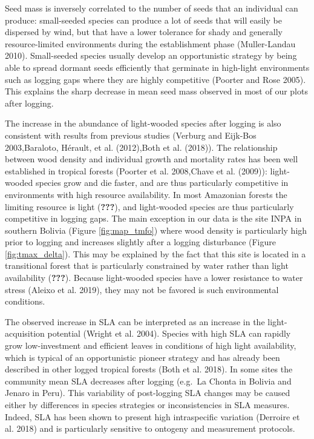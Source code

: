\documentclass[]{elsarticle} %
\begin{document}
Seed mass is inversely correlated to the number of seeds that an
individual can produce: small-seeded species can produce a lot of seeds
that will easily be dispersed by wind, but that have a lower tolerance
for shady and generally resource-limited environments during the
establishment phase (Muller-Landau 2010). Small-seeded species usually
develop an opportunistic strategy by being able to spread dormant seeds
efficiently that germinate in high-light environments such as logging
gaps where they are highly competitive (Poorter and Rose 2005). This
explains the sharp decrease in mean seed mass observed in most of our
plots after logging.

The increase in the abundance of light-wooded species after logging is
also consistent with results from previous studies (Verburg and Eijk-Bos
2003,Baraloto, Hérault, et al. (2012),Both et al. (2018)). The
relationship between wood density and individual growth and mortality
rates has been well established in tropical forests (Poorter et al.
2008,Chave et al. (2009)): light-wooded species grow and die faster, and
are thus particularly competitive in environments with high resource
availability. In most Amazonian forests the limiting resource is light
({\textbf{???}}), and light-wooded species are thus particularly
competitive in logging gaps. The main exception in our data is the site
INPA in southern Bolivia (Figure \ref{fig:map_tmfo}) where wood density
is particularly high prior to logging and increases slightly after a
logging disturbance (Figure \ref{fig:tmax_delta}). This may be explained
by the fact that this site is located in a transitional forest that is
particularly constrained by water rather than light availability
({\textbf{???}}). Because light-wooded species have a lower resistance
to water stress (Aleixo et al. 2019), they may not be favored is such
environmental conditions.

The observed increase in SLA can be interpreted as an increase in the
light-acquisition potential (Wright et al. 2004). Species with high SLA
can rapidly grow low-investment and efficient leaves in conditions of
high light availability, which is typical of an opportunistic pioneer
strategy and has already been described in other logged tropical forests
(Both et al. 2018). In some sites the community mean SLA decreases after
logging (e.g.~La Chonta in Bolivia and Jenaro in Peru). This variability
of post-logging SLA changes may be caused either by differences in
species strategies or inconsistencies in SLA measures. Indeed, SLA has
been shown to present high intraspecific variation (Derroire et al.
2018) and is particularly sensitive to ontogeny and measurement
protocols.
\end{document}
